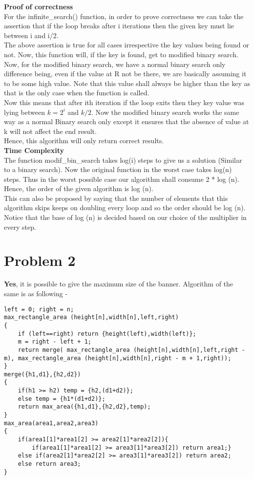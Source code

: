 \documentclass[a4paper,11pt]{article}
\theoremstyle{mytheor}
\begin{document}
\textbf{Proof of correctness}\\
For the infinite\_search() function, in order to prove correctness we can take the assertion that if the loop breaks after i iterations then the given key must lie between i and i/2.\\
The above assertion is true for all cases irrespective the key values being found or not. Now, this function will, if the key is found, get to modified binary search. Now, for the modified binary search, we have a normal binary search only difference being, even if the value at R not be there, we are basically assuming it to be some high value. Note that this value shall always be higher than the key as that is the only case when the function is called.\\
Now this means that after ith iteration if the loop exits then they key value was lying between $k = 2^i$ and $k/2$. Now the modified binary search works the same way as a normal Binary search only except it ensures that the absence of value at k will not affect the end result.\\
Hence, this algorithm will only return correct results.
\\
\textbf{Time Complexity}\\
The function modif\_bin\_search takes log(i) steps to give us a solution (Similar to a binary search). Now the original function in the worst case takes log(n) steps. Thus in the worst possible case our algorithm shall consume 2 * log (n). Hence, the order of the given algorithm is log (n).\\
This can also be proposed by saying that the number of elements that this algorithm skips keeps on doubling every loop and so the order should be log (n).\\
Notice that the base of log (n) is decided based on our choice of the multiplier in every step.

\section*{Problem 2}
\textbf{Yes}, it is possible to give the maximum size of the banner. Algorithm of the same is as following - 
\begin{lstlisting}[caption=Pseudo Code.]
left = 0; right = n;
max_rectangle_area (height[n],width[n],left,right)
{
    if (left==right) return {height(left),width(left)};
    m = right - left + 1;
    return merge( max_rectangle_area (height[n],width[n],left,right - m), max_rectangle_area (height[n],width[n],right - m + 1,right));   
}
merge({h1,d1},{h2,d2})
{
    if(h1 >= h2) temp = {h2,(d1+d2)};
    else temp = {h1*(d1+d2)};
    return max_area({h1,d1},{h2,d2},temp);
}
max_area(area1,area2,area3)
{
    if(area1[1]*area1[2] >= area2[1]*area2[2]){
        if(area1[1]*area1[2] >= area3[1]*area3[2]) return area1;}
    else if(area2[1]*area2[2] >= area3[1]*area3[2]) return area2;
    else return area3;
}

\end{lstlisting}
\end{document}
